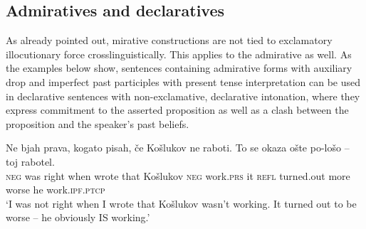 \documentclass[output=paper,
colorlinks,
citecolor=brown,
newtxmath
]{langscibook}
\begin{document}

\subsection{Admiratives and declaratives}\label{sec:decl}

As already pointed out, mirative constructions are not tied to exclamatory illocutionary force crosslinguistically. This applies to the  admirative as well. As the examples below show, sentences containing admirative forms with auxiliary drop and imperfect past participles with present tense interpretation can be used in declarative sentences with non-exclamative, declarative intonation, where they express commitment to the asserted proposition as well as a clash between the proposition and the speaker's past beliefs.

\ea \label{ex:koslukov}
\gll Ne bjah prava, kogato pisah, če Košlukov ne raboti. %
To se okaza ošte po-lošo -- toj rabotel. \\
\textsc{neg} was right when wrote that Košlukov \textsc{neg} work.\textsc{prs}
 it \textsc{refl} turned.out more worse {} he work.\textsc{ipf.ptcp}\\
\glt `I was not right when I wrote that Košlukov wasn't working. It turned out to be worse -- he obviously IS working.'
\z
\end{document}
